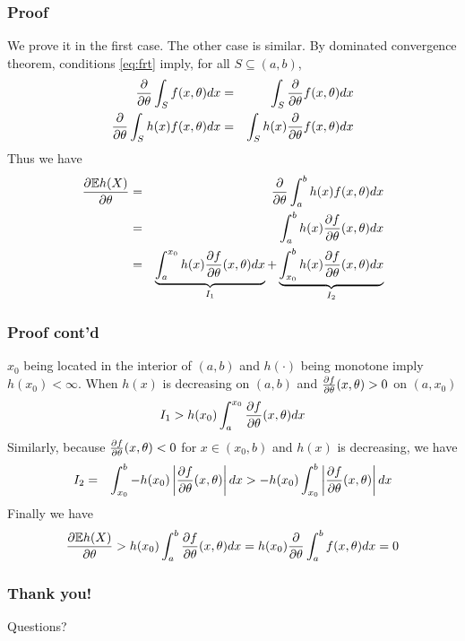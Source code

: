 \documentclass{beamer}
\begin{document}
\begin{frame}
  \frametitle{Proof}
  \begin{scriptsize}
    We prove it in the first case. The other case is similar.
    By dominated convergence theorem, conditions \eqref{eq:frt}
    imply, for all $S \subseteq (a, b)$,
    \begin{eqnarray*}
      {\partial \over \partial \theta}\int_S f(x, \theta) dx
      &=&
      \int_S {\partial \over \partial \theta} f(x, \theta) dx \\
          {\partial \over \partial \theta}\int_S h(x) f(x, \theta) dx
          &=&
          \int_S h(x) {\partial \over \partial \theta} f(x, \theta) dx \\
    \end{eqnarray*}
    Thus we have
    \begin{eqnarray*}
      {\partial  \mathbb{E} h(X) \over \partial \theta}
      &=&
      {\partial \over \partial \theta}
      \int_a^b h(x)
      f(x, \theta) dx \\
      &=& \int_a^b h(x)
      {\partial f \over \partial \theta}(x, \theta) dx \\
      &=& \underbrace{\int_a^{x_0}
        h(x) {\partial f \over \partial \theta}(x, \theta) dx}_{I_1}
      + \underbrace{\int_{x_0}^b
        h(x) {\partial f \over \partial \theta}(x,
        \theta) dx}_{I_2}
    \end{eqnarray*}
  \end{scriptsize}
\end{frame}

\begin{frame}
  \frametitle{Proof cont'd}
  \begin{scriptsize}
    $x_0$ being located in the interior of $(a, b)$ and
    $h(\cdot)$ being monotone imply $h(x_0) < \infty$.
    When $h(x)$ is decreasing on $(a, b)$ and
    ${\partial f \over \partial \theta}(x, \theta) > 0$ on $(a, x_0)$
    \[
    I_1 > h(x_0) \int_a^{x_0}
    {\partial f \over \partial \theta}(x, \theta) dx
    \]
    Similarly, because
    ${\partial f \over \partial \theta}(x, \theta) < 0$ for
    $x \in (x_0, b)$ and $h(x)$ is decreasing, we have
    \begin{eqnarray*}
      I_2 &=& \int_{x_0}^b -h(x_0)
      \left|{\partial f \over \partial \theta}(x, \theta) \right| dx
      > -h(x_0)
      \int_{x_0}^b \left| 
          {\partial f \over \partial \theta}(x, \theta)
          \right| dx
    \end{eqnarray*}
    Finally we have
    \begin{eqnarray*}
      {\partial  \mathbb{E} h(X) \over \partial \theta}
      > h(x_0) \int_a^b
      {\partial f \over \partial \theta}(x, \theta) dx
      = h(x_0) {\partial \over \partial \theta}
      \int_a^b f(x, \theta) dx
      = 0
    \end{eqnarray*}
  \end{scriptsize}
\end{frame}

\begin{frame}
   \frametitle{Thank you!}
   Questions?
 \end{frame}


\end{document}
